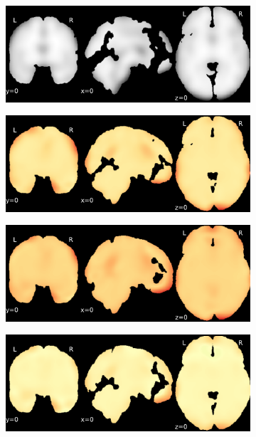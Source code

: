 \documentclass{article}
\begin{document}
\begin{appendices}
\begin{landscape}
\begin{figure}
            \begin{subfigure}[t]{0.2\paperheight}
                \centering
                \includegraphics[width=\textwidth]{figures/sig/20mm/ieee_ds000256_sub-CTS210.pdf}
            \end{subfigure}
            \begin{subfigure}[t]{0.2\paperheight}
                \centering
                \includegraphics[width=\textwidth]{figures/sig/20mm/rr_ds000256_sub-CTS210_sig.pdf}
            \end{subfigure}
            \begin{subfigure}[t]{0.2\paperheight}
                \centering
                \includegraphics[width=\textwidth]{figures/sig/20mm/rs_ds000256_sub-CTS210_sig.pdf}
            \end{subfigure}
            \begin{subfigure}[t]{0.2\paperheight}
                \centering
                \includegraphics[width=\textwidth]{figures/sig/20mm/rr.rs_ds000256_sub-CTS210_sig.pdf}

\end{subfigure}
\end{figure}
\end{landscape}
\end{appendices}
\end{document}
